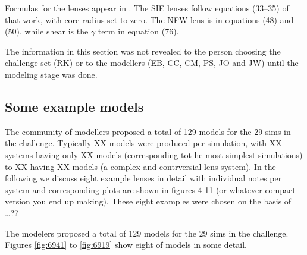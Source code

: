 Formulas for the lenses appear in \cite{2001astro.ph..2341K}. The SIE
lenses follow equations (33--35) of that work, with core radius set to
zero.  The NFW lens is in equations (48) and (50), while shear is the
$\gamma$ term in equation (76).

The information in this section was not revealed to the person
choosing the challenge set (RK) or to the modellers (EB, CC, CM, PS,
JO and JW) until the modeling stage was done.

\subsection{Some example models} \label{sec:example_models}

The community of modellers proposed a total of 129 models for the 29 sims in the challenge. Typically XX models were produced per simulation, with XX systems having only XX models (corresponding tot he most simplest simulations) to XX having XX models (a complex and contrversial lens system). In the following we discuss eight example lenses in detail with individual notes per system and corresponding plots are shown in figures 4-11 (or whatever compact version you end up making). These eight examples were chosen on the basis of …??

The modelers proposed a total of 129 models for the 29 sims in the
challenge.  Figures \ref{fig:6941} to \ref{fig:6919} show eight of
models in some detail.

\vfill{}

